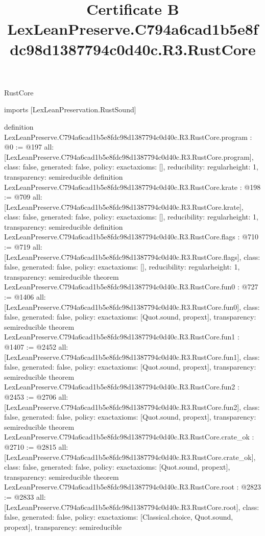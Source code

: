 \begin{lexlean}{RustCore}
\title{Certificate B LexLeanPreserve.C794a6cad1b5e8fdc98d1387794c0d40c.R3.RustCore}
\begin{coremodule}
imports [LexLeanPreservation.RustSound]

definition LexLeanPreserve.C794a6cad1b5e8fdc98d1387794c0d40c.R3.RustCore.program : @0 := @197 {
  all: [LexLeanPreserve.C794a6cad1b5e8fdc98d1387794c0d40c.R3.RustCore.program],
  class: false,
  generated: false,
  policy: exact{axioms: []},
  reducibility: regular{height: 1},
  transparency: semireducible
}
definition LexLeanPreserve.C794a6cad1b5e8fdc98d1387794c0d40c.R3.RustCore.krate : @198 := @709 {
  all: [LexLeanPreserve.C794a6cad1b5e8fdc98d1387794c0d40c.R3.RustCore.krate],
  class: false,
  generated: false,
  policy: exact{axioms: []},
  reducibility: regular{height: 1},
  transparency: semireducible
}
definition LexLeanPreserve.C794a6cad1b5e8fdc98d1387794c0d40c.R3.RustCore.flags : @710 := @719 {
  all: [LexLeanPreserve.C794a6cad1b5e8fdc98d1387794c0d40c.R3.RustCore.flags],
  class: false,
  generated: false,
  policy: exact{axioms: []},
  reducibility: regular{height: 1},
  transparency: semireducible
}
theorem LexLeanPreserve.C794a6cad1b5e8fdc98d1387794c0d40c.R3.RustCore.fun0 : @727 := @1406 {
  all: [LexLeanPreserve.C794a6cad1b5e8fdc98d1387794c0d40c.R3.RustCore.fun0],
  class: false,
  generated: false,
  policy: exact{axioms: [Quot.sound, propext]},
  transparency: semireducible
}
theorem LexLeanPreserve.C794a6cad1b5e8fdc98d1387794c0d40c.R3.RustCore.fun1 : @1407 := @2452 {
  all: [LexLeanPreserve.C794a6cad1b5e8fdc98d1387794c0d40c.R3.RustCore.fun1],
  class: false,
  generated: false,
  policy: exact{axioms: [Quot.sound, propext]},
  transparency: semireducible
}
theorem LexLeanPreserve.C794a6cad1b5e8fdc98d1387794c0d40c.R3.RustCore.fun2 : @2453 := @2706 {
  all: [LexLeanPreserve.C794a6cad1b5e8fdc98d1387794c0d40c.R3.RustCore.fun2],
  class: false,
  generated: false,
  policy: exact{axioms: [Quot.sound, propext]},
  transparency: semireducible
}
theorem LexLeanPreserve.C794a6cad1b5e8fdc98d1387794c0d40c.R3.RustCore.crate_ok : @2710 := @2815 {
  all: [LexLeanPreserve.C794a6cad1b5e8fdc98d1387794c0d40c.R3.RustCore.crate_ok],
  class: false,
  generated: false,
  policy: exact{axioms: [Quot.sound, propext]},
  transparency: semireducible
}
theorem LexLeanPreserve.C794a6cad1b5e8fdc98d1387794c0d40c.R3.RustCore.root : @2823 := @2833 {
  all: [LexLeanPreserve.C794a6cad1b5e8fdc98d1387794c0d40c.R3.RustCore.root],
  class: false,
  generated: false,
  policy: exact{axioms: [Classical.choice, Quot.sound, propext]},
  transparency: semireducible
}


\end{coremodule}
\end{lexlean}
